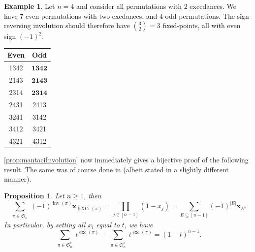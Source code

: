 \documentclass[reqno]{amsart}
\newtheorem{proposition}[theorem]{Proposition}
\theoremstyle{definition}
\newtheorem{example}[theorem]{Example}
\newcommand{\xvec}{\mathbf{x}}
\newcommand{\symS}{\mathfrak{S}}
\DeclareMathOperator{\inv}{inv}
\DeclareMathOperator{\exc}{exc}
\DeclareMathOperator{\EXCi}{EXCi}
\begin{document}
\begin{example}
 Let $n=4$ and consider all permutations with $2$ excedances.
 We have $7$ even permutations with two exedances,
 and $4$ odd permutations. The sign-reversing involution should therefore have 
 $\binom{3}{2}=3$ fixed-points, all with even sign $(-1)^2$.
 \begin{center}
\begin{tabular}{cc}
Even & Odd \\
\toprule
1342 & $\mathbf{1342}$\\
2143 & $\mathbf{2143}$\\
2314 & $\mathbf{2314}$\\
2431 & 2413  \\
3241 & 3142 \\
3412 & 3421 \\
4321 & 4312 \\
\end{tabular}
\end{center}
\end{example}


\cref{prop:mantaciInvolution} now immediately gives a bijective proof of the following result. 
The same was of course done in \cite{Mantaci1993} (albeit stated in a slightly different manner).
\begin{proposition}\label{lem:excEvenOdd}
Let $n \geq 1$, then
\begin{equation}\label{eq:excEvenOdd}
 \sum_{\substack{\pi \in \symS_n}} (-1)^{\inv(\pi)} \xvec_{\EXCi(\pi)} = 
 \prod_{j \in [n-1]} (1-x_j) = \sum_{E \subseteq [n-1]} (-1)^{|E|}\xvec_{E}.
\end{equation}
In particular, by setting all $x_i$ equal to $t$, 
we have
\[
 \sum_{\substack{\pi \in \symS^e_n}} t^{\exc(\pi)} 
 -
 \sum_{\substack{\pi \in \symS^o_n }} t^{\exc(\pi)} = (1-t)^{n-1}.
\]
\end{proposition}
\end{document}
